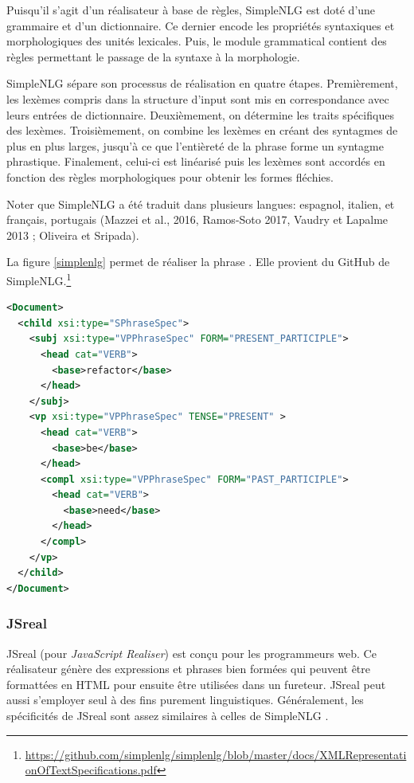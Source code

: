 Puisqu'il s'agit d'un réalisateur à base de règles, SimpleNLG est doté d'une grammaire et d'un dictionnaire. Ce dernier encode les propriétés syntaxiques et morphologiques des unités lexicales. Puis, le module grammatical contient des règles permettant le passage de la syntaxe à la morphologie.

SimpleNLG sépare son processus de réalisation en quatre étapes. Premièrement, les lexèmes compris dans la structure d'input sont mis en correspondance avec leurs entrées de dictionnaire. Deuxièmement, on détermine les traits spécifiques des lexèmes. Troisièmement, on combine les lexèmes en créant des syntagmes de plus en plus larges, jusqu'à ce que l'entièreté de la phrase forme un syntagme phrastique. Finalement, celui-ci est linéarisé puis les lexèmes sont accordés en fonction des règles morphologiques pour obtenir les formes fléchies.

Noter que SimpleNLG a été traduit dans plusieurs langues: espagnol, italien, et français, portugais (Mazzei et al., 2016, Ramos-Soto 2017, Vaudry et Lapalme 2013 ; Oliveira et Sripada).

La figure \ref{simplenlg} permet de réaliser la phrase . Elle provient du GitHub de SimpleNLG.\footnote{\url{https://github.com/simplenlg/simplenlg/blob/master/docs/XMLRepresentationOfTextSpecifications.pdf}}

\begin{lstlisting}[language=Xml, caption=Structure d'input dans SimpleNLG, label=simplenlg]
<Document>
  <child xsi:type="SPhraseSpec">
    <subj xsi:type="VPPhraseSpec" FORM="PRESENT_PARTICIPLE">
      <head cat="VERB">
        <base>refactor</base>
      </head>
    </subj>
    <vp xsi:type="VPPhraseSpec" TENSE="PRESENT" >
      <head cat="VERB">
        <base>be</base>
      </head>
      <compl xsi:type="VPPhraseSpec" FORM="PAST_PARTICIPLE">
        <head cat="VERB">
          <base>need</base>
        </head>
      </compl>
    </vp>
  </child>
</Document>
\end{lstlisting}

\subsubsection{JSreal}
JSreal (pour \emph{JavaScript Realiser}) \citep{DaoustJSREALTextRealizer2015} est conçu pour les programmeurs web. Ce réalisateur génère des expressions et phrases bien formées qui peuvent être formattées en HTML pour ensuite être utilisées dans un fureteur. JSreal peut aussi s'employer seul à des fins purement linguistiques. Généralement, les spécificités de JSreal sont assez similaires à celles de SimpleNLG \citep{GattSimpleNLGRealisationEngine2009}.

